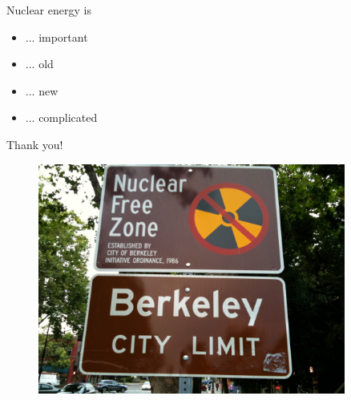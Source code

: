 \documentclass{beamer}
\begin{document}
    \begin{frame}{Nuclear energy is}
        \begin{itemize}
            \item ... important
            \pause
            \item ... old
            \pause
            \item ... new
            \pause
            \item ... complicated
        \end{itemize}
    \end{frame}

    \begin{frame}{Thank you!}
        \begin{figure}
            \centering
            \includegraphics[width=0.9\textwidth]{./img/nuclearFree.jpg}
            \caption*{}
        \end{figure}
    \end{frame}
\end{document}
